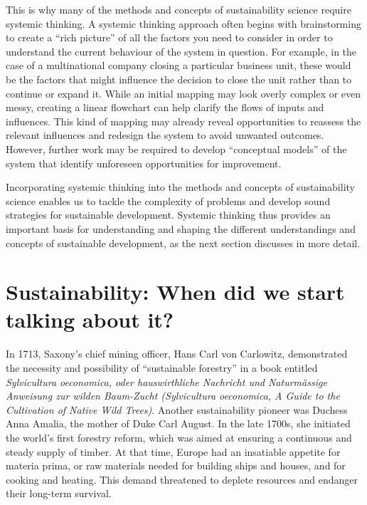 \documentclass[
  a4paper,
  DIV=11,
  numbers=noendperiod,
  oneside,
  openany]{scrreprt}
\begin{document}
This is why many of the methods and concepts of sustainability science
require systemic thinking. A systemic thinking approach often begins
with brainstorming to create a ``rich picture'' of all the factors you
need to consider in order to understand the current behaviour of the
system in question. For example, in the case of a multinational company
closing a particular business unit, these would be the factors that
might influence the decision to close the unit rather than to continue
or expand it. While an initial mapping may look overly complex or even
messy, creating a linear flowchart can help clarify the flows of inputs
and influences. This kind of mapping may already reveal opportunities to
reassess the relevant influences and redesign the system to avoid
unwanted outcomes. However, further work may be required to develop
``conceptual models'' of the system that identify unforeseen
opportunities for improvement.

Incorporating systemic thinking into the methods and concepts of
sustainability science enables us to tackle the complexity of problems
and develop sound strategies for sustainable development. Systemic
thinking thus provides an important basis for understanding and shaping
the different understandings and concepts of sustainable development, as
the next section discusses in more detail.

\section{Sustainability: When did we start talking about
it?}\label{sustainability-when-did-we-start-talking-about-it}

In 1713, Saxony's chief mining officer, Hans Carl von Carlowitz,
demonstrated the necessity and possibility of ``sustainable forestry''
in a book entitled \emph{Sylvicultura oeconomica, oder hauswirthliche
Nachricht und Naturmässige Anweisung zur wilden Baum-Zucht (Sylvicultura
oeconomica, A Guide to the Cultivation of Native Wild Trees)}. Another
sustainability pioneer was Duchess Anna Amalia, the mother of Duke Carl
August. In the late 1700s, she initiated the world's first forestry
reform, which was aimed at ensuring a continuous and steady supply of
timber. At that time, Europe had an insatiable appetite for materia
prima, or raw materials needed for building ships and houses, and for
cooking and heating. This demand threatened to deplete resources and
endanger their long-term survival.
\end{document}
